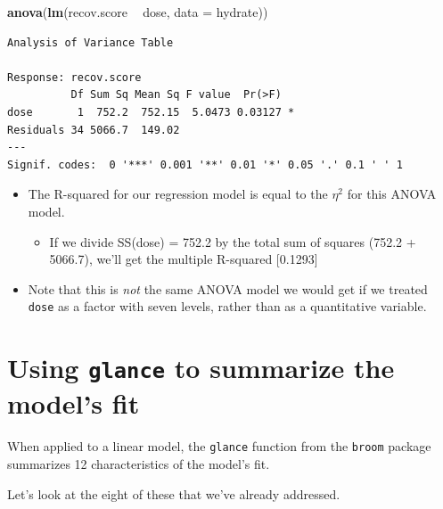 \documentclass[
]{book}
\newenvironment{Shaded}{\begin{snugshade}}{\end{snugshade}}
\newcommand{\DataTypeTok}[1]{\textcolor[rgb]{0.13,0.29,0.53}{#1}}
\newcommand{\DecValTok}[1]{\textcolor[rgb]{0.00,0.00,0.81}{#1}}
\newcommand{\KeywordTok}[1]{\textcolor[rgb]{0.13,0.29,0.53}{\textbf{#1}}}
\newcommand{\NormalTok}[1]{#1}
\newcommand{\OperatorTok}[1]{\textcolor[rgb]{0.81,0.36,0.00}{\textbf{#1}}}
\newcommand{\StringTok}[1]{\textcolor[rgb]{0.31,0.60,0.02}{#1}}
\providecommand{\tightlist}{%
  \setlength{\itemsep}{0pt}\setlength{\parskip}{0pt}}
\begin{document}
\begin{Shaded}
\begin{Highlighting}[]
\KeywordTok{anova}\NormalTok{(}\KeywordTok{lm}\NormalTok{(recov.score }\OperatorTok{~}\StringTok{ }\NormalTok{dose, }\DataTypeTok{data =}\NormalTok{ hydrate))}
\end{Highlighting}
\end{Shaded}

\begin{verbatim}
Analysis of Variance Table

Response: recov.score
          Df Sum Sq Mean Sq F value  Pr(>F)  
dose       1  752.2  752.15  5.0473 0.03127 *
Residuals 34 5066.7  149.02                  
---
Signif. codes:  0 '***' 0.001 '**' 0.01 '*' 0.05 '.' 0.1 ' ' 1
\end{verbatim}

\begin{itemize}
\tightlist
\item
  The R-squared for our regression model is equal to the \(\eta^2\) for this ANOVA model.

  \begin{itemize}
  \tightlist
  \item
    If we divide SS(dose) = 752.2 by the total sum of squares (752.2 + 5066.7), we'll get the multiple R-squared {[}0.1293{]}
  \end{itemize}
\item
  Note that this is \emph{not} the same ANOVA model we would get if we treated \texttt{dose} as a factor with seven levels, rather than as a quantitative variable.
\end{itemize}

\hypertarget{using-glance-to-summarize-the-models-fit}{%
\section{\texorpdfstring{Using \texttt{glance} to summarize the model's fit}{Using glance to summarize the model's fit}}\label{using-glance-to-summarize-the-models-fit}}

When applied to a linear model, the \texttt{glance} function from the \texttt{broom} package summarizes 12 characteristics of the model's fit.

Let's look at the eight of these that we've already addressed.

\begin{Shaded}
\end{Shaded}
\end{document}
